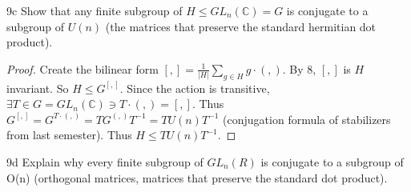 \documentclass{article}
\newcommand{\C}{\mathbb{C}}
\begin{document}
\begin{claim}{9c}\label{Claim 9c.}
    Show that any finite subgroup of $H \leq GL_n(\C) = G$ is conjugate to a subgroup of $U(n)$ (the matrices that preserve the standard hermitian dot product).
\end{claim}
\begin{proof}
    Create the bilinear form $[ , ] = \frac{1}{|H|} \sum_{g \in H} g \cdot ( , )$. By 8, $[ , ]$ is $H$ invariant. So $H \leq G^{[ , ]}$. Since the action is transitive, $\exists T \in G = GL_n(\C) \ni T \cdot (, ) =[ , ]$. Thus $G^{[ , ]} = G^{T \cdot (, )} = T G^{(,)} T^{-1} = T U(n) T^{-1}$ (conjugation formula of stabilizers from last semester). Thus $H \leq T U(n) T^{-1}$.       
\end{proof}

\begin{claim}{9d}\label{Claim 9d.}
    Explain why every finite subgroup of $GL_n(R)$ is conjugate to a subgroup of O(n) (orthogonal matrices, matrices that preserve the standard dot product).
\end{claim}
\end{document}
